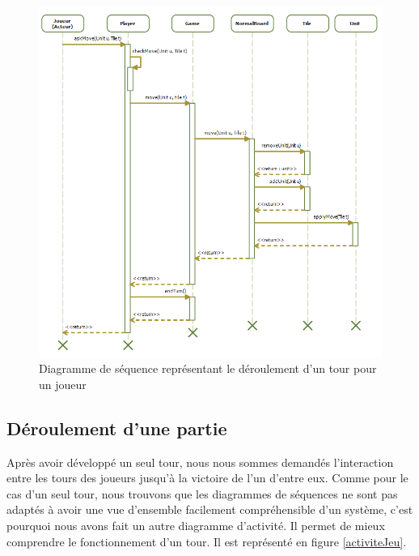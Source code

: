 \begin{figure}[!h] 
\centerline{\includegraphics[width=\textwidth]{img/sequence_tour_ex.png}}
   \caption{\label{étiquette} Diagramme de séquence représentant le déroulement d'un tour pour un joueur}
\label{sequenceTour}
\end{figure}

\subsection{Déroulement d'une partie}
Après avoir développé un seul tour, nous nous sommes demandés l'interaction entre les tours des joueurs jusqu'à la victoire de l'un d'entre eux. Comme pour le cas d'un seul tour, nous trouvons que les diagrammes de séquences ne sont pas adaptés à avoir une vue d'ensemble facilement compréhensible d'un système, c'est pourquoi nous avons fait un autre diagramme d'activité. Il permet de mieux comprendre le fonctionnement d'un tour. Il est représenté en figure \ref{activiteJeu}.\\

